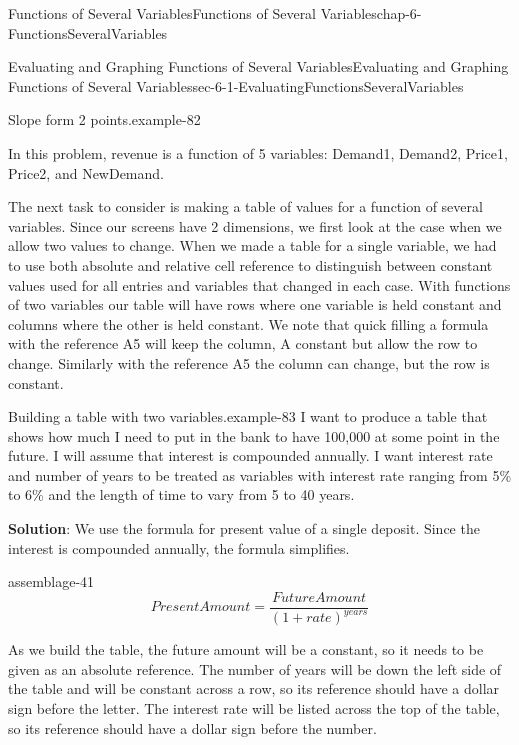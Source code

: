 \documentclass[oneside,10pt,]{book}
\newcommand{\terminology}[1]{\textbf{#1}}
\numberwithin{equation}{section}
\begin{document}
\begin{chapterptx}{Functions of Several Variables}{}{Functions of Several Variables}{}{}{chap-6-FunctionsSeveralVariables}
\begin{sectionptx}{Evaluating and Graphing Functions of Several Variables}{}{Evaluating and Graphing Functions of Several Variables}{}{}{sec-6-1-EvaluatingFunctionsSeveralVariables}
\begin{example}{Slope form 2 points.}{example-82}
\begin{sidebyside}{1}{0.3}{0.3}{0}
\begin{sbspanel}{0.4}
\end{sbspanel}%
\end{sidebyside}%
\par
\hypertarget{p-2121}{}%
In this problem, revenue is a function of 5 variables: Demand1, Demand2, Price1, Price2, and NewDemand.%
\end{example}
\hypertarget{p-2122}{}%
The next task to consider is making a table of values for a function of several variables.  Since our screens have 2 dimensions, we first look at the case when we allow two values to change.  When we made a table for a single variable, we had to use both absolute and relative cell reference to distinguish between constant values used for all entries and variables that changed in each case.  With functions of two variables our table will have rows where one variable is held constant and columns where the other is held constant.  We note that quick filling a formula with the reference \textdollar{}A5 will keep the column, A constant but allow the row to change.  Similarly with the reference A\textdollar{}5 the column can change, but the row is constant.%
\begin{example}{Building a table with two variables.}{example-83}%
\hypertarget{p-2123}{}%
I want to produce a table that shows how much I need to put in the bank to have \textdollar{}100,000 at some point in the future.  I will assume that interest is compounded annually.  I want interest rate and number of years to be treated as variables with interest rate ranging from 5\% to 6\% and the length of time to vary from 5 to 40 years.%
\par
\hypertarget{p-2124}{}%
\terminology{Solution}: We use the formula for present value of a single deposit.  Since the interest is compounded annually, the formula simplifies.%
\begin{assemblage}{}{assemblage-41}%
\hypertarget{p-2125}{}%
%
\begin{equation*}
PresentAmount=\frac{FutureAmount}{(1+rate)^{years}}
\end{equation*}
%
\end{assemblage}
\hypertarget{p-2126}{}%
As we build the table, the future amount will be a constant, so it needs to be given as an absolute reference.  The number of years will be down the left side of the table and will be constant across a row, so its reference should have a dollar sign before the letter.  The interest rate will be listed across the top of the table, so its reference should have a dollar sign before the number.%
\begin{sidebyside}{1}{0.1}{0.1}{0}%

\end{sidebyside}
\end{example}
\end{sectionptx}
\end{chapterptx}
\end{document}
